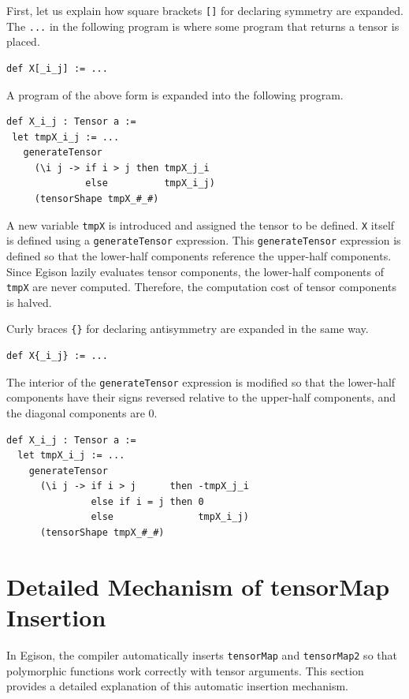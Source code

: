 First, let us explain how square brackets \lstinline|[]| for declaring symmetry are expanded.
The \lstinline{...} in the following program is where some program that returns a tensor is placed.
\begin{lstlisting}[language=egison,numbers=none]
def X[_i_j] := ...
\end{lstlisting}
A program of the above form is expanded into the following program.
\begin{lstlisting}[language=egison,numbers=none]
def X_i_j : Tensor a :=
 let tmpX_i_j := ...
   generateTensor
     (\i j -> if i > j then tmpX_j_i
              else          tmpX_i_j)
     (tensorShape tmpX_#_#)
\end{lstlisting}
A new variable \lstinline{tmpX} is introduced and assigned the tensor to be defined.
\lstinline{X} itself is defined using a \lstinline{generateTensor} expression.
This \lstinline{generateTensor} expression is defined so that the lower-half components reference the upper-half components.
Since Egison lazily evaluates tensor components, the lower-half components of \lstinline{tmpX} are never computed.
Therefore, the computation cost of tensor components is halved.

Curly braces \lstinline|{}| for declaring antisymmetry are expanded in the same way.
\begin{lstlisting}[language=egison,numbers=none]
def X{_i_j} := ...
\end{lstlisting}
The interior of the \lstinline{generateTensor} expression is modified so that the lower-half components have their signs reversed relative to the upper-half components, and the diagonal components are $0$.
\begin{lstlisting}[language=egison,numbers=none]
def X_i_j : Tensor a :=
  let tmpX_i_j := ...
    generateTensor
      (\i j -> if i > j      then -tmpX_j_i
               else if i = j then 0
               else               tmpX_i_j)
      (tensorShape tmpX_#_#)
\end{lstlisting}

\section{Detailed Mechanism of tensorMap Insertion}

In Egison, the compiler automatically inserts \lstinline{tensorMap} and \lstinline{tensorMap2} so that polymorphic functions work correctly with tensor arguments.
This section provides a detailed explanation of this automatic insertion mechanism.

